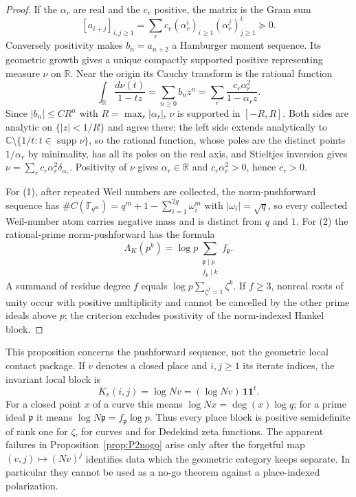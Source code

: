 \documentclass[11pt]{amsart}
\theoremstyle{definition}
\theoremstyle{remark}
\newcommand{\C}{\mathbb C}
\newcommand{\R}{\mathbb R}
\begin{document}
\begin{proof}
If the $\alpha_r$ are real and the $c_r$ positive, the matrix is the Gram
sum
\[
 [a_{i+j}]_{i,j\ge1}
 =\sum_r c_r(\alpha_r^i)_{i\ge1}(\alpha_r^j)_{j\ge1}^{t}\succeq0.
\]
Conversely positivity makes $b_n=a_{n+2}$ a Hamburger moment sequence.
Its geometric growth gives a unique compactly supported positive
representing measure $\nu$ on $\R$.  Near the origin its Cauchy transform is
the rational function
\[
 \int_\R\frac{d\nu(t)}{1-tz}
 =\sum_{n\ge0}b_nz^n
 =\sum_r\frac{c_r\alpha_r^2}{1-\alpha_rz}.
\]
Since $|b_n|\le CR^n$ with $R=\max_r|\alpha_r|$, $\nu$ is supported in
$[-R,R]$.  Both sides are analytic on $\{|z|<1/R\}$ and agree there; the
left side extends analytically to $\C\setminus\{1/t:t\in\operatorname{supp}\nu\}$,
so the rational function, whose poles are the distinct points $1/\alpha_r$
by minimality, has all its poles on the real axis, and Stieltjes inversion
gives $\nu=\sum_rc_r\alpha_r^2\delta_{\alpha_r}$.  Positivity of $\nu$ gives
$\alpha_r\in\R$ and $c_r\alpha_r^2>0$, hence $c_r>0$.

For (1), after repeated Weil numbers are collected, the norm-pushforward
sequence has
$\#C(\mathbb F_{q^m})=q^m+1-\sum_{i=1}^{2g}\omega_i^m$ with
$|\omega_i|=\sqrt q$, so every collected Weil-number atom carries negative
mass and is distinct from $q$ and $1$.  For (2) the rational-prime
norm-pushforward has the formula
\[
 \Lambda_K(p^k)=\log p
 \sum_{\substack{\mathfrak p\mid p\\ f_{\mathfrak p}\mid k}}
 f_{\mathfrak p}.
\]
A summand of residue degree $f$ equals
$\log p\sum_{\zeta^f=1}\zeta^k$.  If $f\ge3$, nonreal roots of unity occur
with positive multiplicity and cannot be cancelled by the other prime ideals
above $p$; the criterion excludes positivity of the norm-indexed Hankel
block.
\end{proof}

This proposition concerns the pushforward sequence, not the geometric local
contact package.  If $v$ denotes a closed place and $i,j\ge1$ its iterate
indices, the invariant local block is
\begin{equation}\label{eq:placeindexedcontact}
 K_v(i,j)=\log Nv=(\log Nv)\,\mathbf1\mathbf1^t.
\end{equation}
For a closed point $x$ of a curve this means $\log Nx=\deg(x)\log q$; for a
prime ideal $\mathfrak p$ it means
$\log N\mathfrak p=f_{\mathfrak p}\log p$.  Thus every place block is
positive semidefinite of rank one for $\zeta$, for curves and for Dedekind
zeta functions.  The apparent failures in Proposition~\ref{prop:P2nogo}
arise only after the forgetful map $(v,j)\mapsto (Nv)^j$ identifies data
which the geometric category keeps separate.  In particular they cannot be
used as a no-go theorem against a place-indexed polarization.
\end{document}
